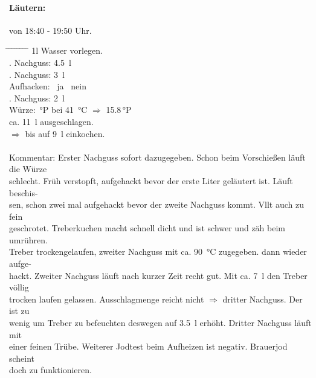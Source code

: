 \documentclass[12pt,oneside,a4paper]{scrartcl}
\begin{document}
\paragraph{Läutern:} von 18:40 - 19:50 Uhr.
	\begin{tabbing}
		\hspace{1cm} \= \hspace{1cm} \= \hspace{1cm} \= \hspace{1cm} \= \hspace{1cm} \=\hspace{1cm} \=\hspace{1cm} \=\hspace{1cm} \= \kill
		\> 1l Wasser vorlegen.\\
		\> . Nachguss: \> \> \> \SI{4,5}{\litre}\\
		\> . Nachguss: \> \> \> \SI{3}{\litre}\\
		\> \> \> Aufhacken: \> \> \CheckedBox \ ja \> \> \Square \ nein\\
		\> . Nachguss: \> \> \> \SI{2}{\litre}\\
		\> Würze: \> \> \,°P\> bei \> \SI{41}{\celsius} \> $\Rightarrow$ \> \num{15,8}\,°P\\
		\> \> \> ca. \SI{11}{\litre} ausgeschlagen.\\
		\> \> \> $\Rightarrow$ bis auf \SI{9}{\litre} einkochen.\\ \\
		\> Kommentar: \>\>\>Erster Nachguss sofort dazugegeben. Schon beim Vorschießen läuft die Würze\\
		\>\>\>schlecht. Früh verstopft, aufgehackt bevor der erste Liter geläutert ist. Läuft beschis-\\
		\>\>\>sen, schon zwei mal aufgehackt bevor der zweite Nachguss kommt. Vllt auch zu fein\\
		\>\>\>geschrotet. Treberkuchen macht schnell dicht und ist schwer und zäh beim umrühren.\\
		\>\>\>Treber trockengelaufen, zweiter Nachguss mit ca. \SI{90}{\celsius} zugegeben. dann wieder aufge-\\
		\>\>\>hackt. Zweiter Nachguss läuft nach kurzer Zeit recht gut. Mit ca. \SI{7}{\litre} den Treber völlig\\
		\> \> \>trocken laufen gelassen. Ausschlagmenge reicht nicht $\Rightarrow$ dritter Nachguss. Der ist zu \\
		\> \> \>wenig um Treber zu befeuchten deswegen auf \SI{3,5}{\litre} erhöht. Dritter Nachguss läuft mit\\
		\> \> \>einer feinen Trübe. Weiterer Jodtest beim Aufheizen ist negativ. Brauerjod scheint\\
		\> \> \>doch zu funktionieren.\\
	\end{tabbing}
\end{document}
